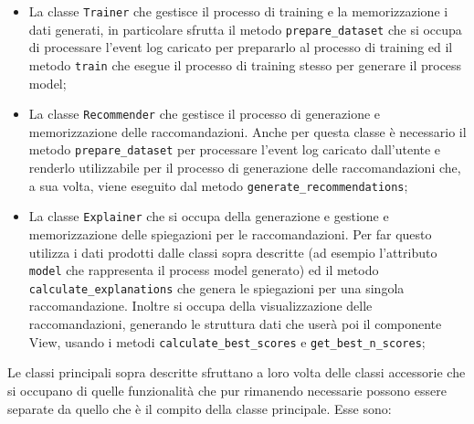 \begin{itemize}
\item La classe \texttt{Trainer} che gestisce il processo di training e la memorizzazione i dati generati, in particolare sfrutta il metodo \texttt{prepare\_dataset} che si occupa di processare l'event log caricato per prepararlo al processo di training ed il metodo \texttt{train} che esegue il processo di training stesso per generare il process model;


\item La classe \texttt{Recommender} che gestisce il processo di generazione e memorizzazione delle raccomandazioni. Anche per questa classe è necessario il metodo \texttt{prepare\_dataset} per processare l'event log caricato dall'utente e renderlo utilizzabile per il processo di generazione delle raccomandazioni che, a sua volta, viene eseguito dal metodo \texttt{generate\_recommendations};

\item La classe \texttt{Explainer} che si occupa della generazione e gestione e memorizzazione delle spiegazioni per le raccomandazioni. Per far questo utilizza i dati prodotti dalle classi sopra descritte (ad esempio l'attributo \texttt{model} che rappresenta il process model generato) ed il metodo \texttt{calculate\_explanations} che genera le spiegazioni per una singola raccomandazione. Inoltre si occupa della visualizzazione delle raccomandazioni, generando le struttura dati che userà poi il componente View, usando i metodi \texttt{calculate\_best\_scores} e \texttt{get\_best\_n\_scores};

\end{itemize}

Le classi principali sopra descritte sfruttano a loro volta delle classi accessorie che si occupano di quelle funzionalità che pur rimanendo necessarie possono essere separate da quello che è il compito della classe principale. Esse sono:

